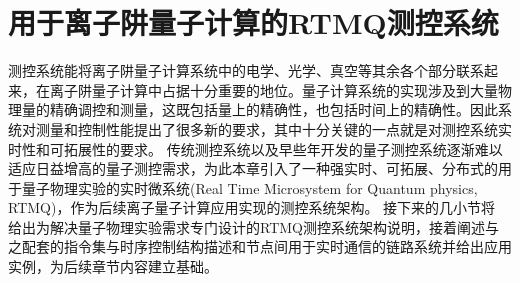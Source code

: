 
\chapter[用于离子阱量子计算的RTMQ测控系统]{用于离子阱量子计算的RTMQ测控系统\label{section:fpga_rtmq}}


测控系统能将离子阱量子计算系统中的电学、光学、真空等其余各个部分联系起来，在离子阱量子计算中占据十分重要的地位。量子计算系统的实现涉及到大量物理量的精确调控和测量，这既包括量上的精确性，也包括时间上的精确性。因此系统对测量和控制性能提出了很多新的要求，其中十分关键的一点就是对测控系统实时性和可拓展性的要求。
传统测控系统以及早些年开发的量子测控系统逐渐难以适应日益增高的量子测控需求，为此本章引入了一种强实时、可拓展、分布式的用于量子物理实验的实时微系统(Real Time Microsystem for Quantum physics, RTMQ)，作为后续离子量子计算应用实现的测控系统架构。
接下来的几小节将
给出为解决量子物理实验需求专门设计的RTMQ测控系统架构说明，接着阐述与之配套的指令集与时序控制结构描述和节点间用于实时通信的链路系统并给出应用实例，为后续章节内容建立基础。




